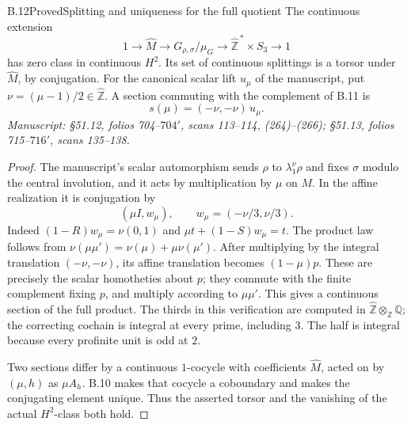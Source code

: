 \begin{statement}{B.12}{Proved}{Splitting and uniqueness for the full quotient}
The continuous extension
\[
 1\longrightarrow\widehat M\longrightarrow
 G_{\rho,\sigma}/\mu_G\longrightarrow
 \widehat{\mathbb Z}^{\,*}\times S_3\longrightarrow1
\]
has zero class in continuous \(H^2\). Its set of continuous splittings
is a torsor under \(\widehat M\), by conjugation.
For the canonical scalar lift \(u_\mu\) of the manuscript, put
\(\nu=(\mu-1)/2\in\widehat{\mathbb Z}\). A section commuting with the
complement of B.11 is
\[
 s(\mu)=(-\nu,-\nu)\,u_\mu.
\]
\emph{Manuscript: \S51.12, folios 704--\(704'\), scans 113--114,
(264)--(266); \S51.13, folios 715--\(716'\), scans 135--138.}
\end{statement}
\begin{proof}
The manuscript's scalar automorphism sends
\(\rho\) to \(\lambda_1^\nu\rho\) and fixes \(\sigma\) modulo the
central involution, and it acts by multiplication by \(\mu\) on \(M\).
In the affine realization it is conjugation by
\[
 (\mu I,w_\mu),\qquad w_\mu=(-\nu/3,\nu/3).
\]
Indeed \((1-R)w_\mu=\nu(0,1)\) and
\(\mu t+(1-S)w_\mu=t\). The product law follows from
\(\nu(\mu\mu')=\nu(\mu)+\mu\nu(\mu')\).
After multiplying by the integral translation \((-\nu,-\nu)\),
its affine translation becomes \((1-\mu)p\).
These are precisely the scalar homotheties about \(p\); they commute
with the finite complement fixing \(p\), and multiply according to
\(\mu\mu'\). This gives a continuous section of the full product.
The thirds in this verification are computed in
\(\widehat{\mathbb Z}\otimes_{\mathbb Z}\mathbb Q\); the correcting
cochain is integral at every prime, including \(3\).
The half is integral because every profinite unit is odd at \(2\).

Two sections differ by a continuous \(1\)-cocycle with coefficients
\(\widehat M\), acted on by \((\mu,h)\) as \(\mu A_h\).
B.10 makes that cocycle a coboundary and makes the conjugating
element unique. Thus the asserted torsor and the vanishing of the
actual \(H^2\)-class both hold.
\end{proof}

